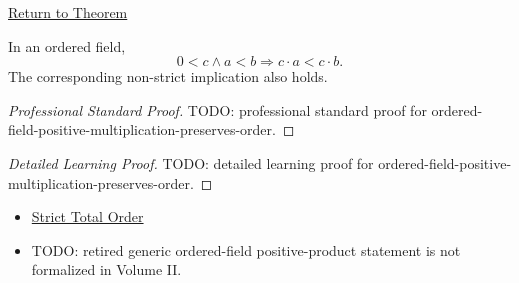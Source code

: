 \newpage
{}
\label{prf:ordered-field-positive-multiplication-preserves-order}

\begin{remark*}[Return]
\hyperref[thm:ordered-field-positive-multiplication-preserves-order]{Return to Theorem}
\end{remark*}

\begin{theorem*}
In an ordered field,
\[
0<c\land a<b
\Longrightarrow
c\cdot a<c\cdot b.
\]
The corresponding non-strict implication also holds.
\end{theorem*}

\begin{proof}[Professional Standard Proof]
\LRAProofBodyStart
TODO: professional standard proof for ordered-field-positive-multiplication-preserves-order.
\end{proof}

\begin{proof}[Detailed Learning Proof]
\LRAProofBodyStart
TODO: detailed learning proof for ordered-field-positive-multiplication-preserves-order.
\end{proof}

\begin{remark*}
\end{remark*}

\begin{dependencies}
\begin{itemize}
  \item \hyperref[def:strict-total-order]{Strict Total Order}
  \item TODO: retired generic ordered-field positive-product statement is not formalized in Volume II.
\end{itemize}
\end{dependencies}

\clearpage
